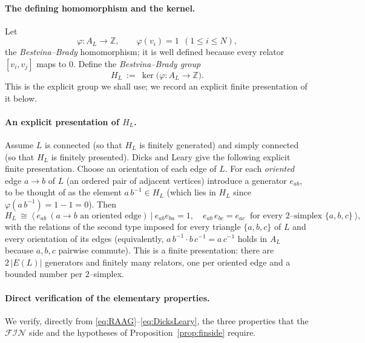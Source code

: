 \documentclass{amsart}
\theoremstyle{definition}
\newcommand{\Z}{\mathbb{Z}}
\newcommand{\FIN}{\mathcal{F\!I\!N}}
\newcommand{\AL}{A_{L}}
\newcommand{\HL}{H_{L}}
\begin{document}
\paragraph{The defining homomorphism and the kernel.}
Let
\begin{equation}\label{eq:phi}
\varphi:\AL\longrightarrow\Z,\qquad \varphi(v_i)=1\ \ (1\le i\le N),
\end{equation}
the \emph{Bestvina--Brady} homomorphism; it is well defined because every relator
$[v_i,v_j]$ maps to $0$. Define the \emph{Bestvina--Brady group}
\begin{equation}\label{eq:HL}
\HL\ :=\ \ker\big(\varphi:\AL\to\Z\big).
\end{equation}
This is the explicit group we shall use; we record an explicit finite presentation of it
below.

\paragraph{An explicit presentation of $\HL$.}
Assume $L$ is connected (so that $\HL$ is finitely generated) and simply connected (so that
$\HL$ is finitely presented). Dicks and Leary \cite[Theorem~1]{DicksLeary} give the following
explicit finite presentation. Choose an orientation of each edge of $L$. For each
\emph{oriented} edge $a\to b$ of $L$ (an ordered pair of adjacent vertices) introduce a
generator $e_{ab}$, to be thought of as the element $a\,b^{-1}\in\HL$ (which lies in $\HL$
since $\varphi(a\,b^{-1})=1-1=0$). Then
\begin{equation}\label{eq:DicksLeary}
\HL\ \cong\ \Big\langle\ e_{ab}\ (a\to b \text{ an oriented edge})\ \Big|\
e_{ab}e_{ba}=1,\quad e_{ab}\,e_{bc}=e_{ac}\ \text{ for every }2\text{--simplex } \{a,b,c\}\ \Big\rangle,
\end{equation}
with the relations of the second type imposed for every triangle $\{a,b,c\}$ of $L$ and every
orientation of its edges (equivalently, $a\,b^{-1}\cdot b\,c^{-1}=a\,c^{-1}$ holds in $\AL$
because $a,b,c$ pairwise commute). This is a finite presentation: there are
$2\,|E(L)|$ generators and finitely many relators, one per oriented edge and a bounded number
per $2$--simplex.

\paragraph{Direct verification of the elementary properties.}
We verify, directly from \eqref{eq:RAAG}--\eqref{eq:DicksLeary}, the three properties that the
$\FIN$ side and the hypotheses of Proposition~\ref{prop:finside} require.
\end{document}
